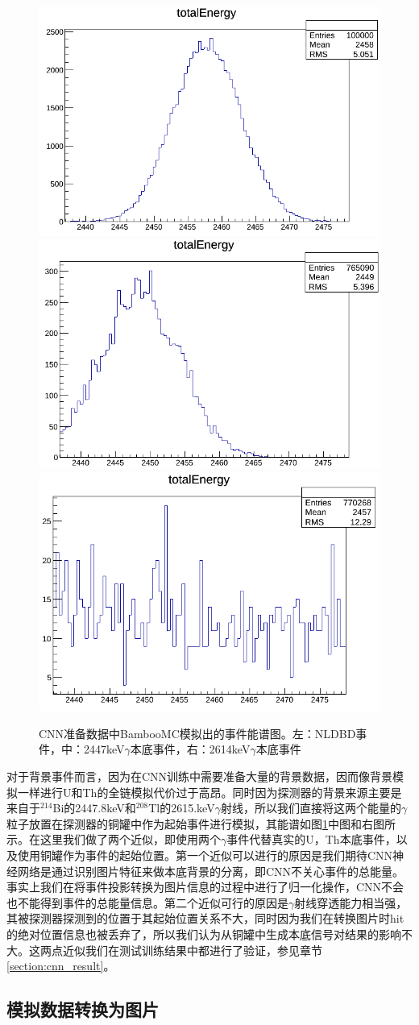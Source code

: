 \begin{figure}
    \centering
    \includegraphics[width=0.3\columnwidth]{pic/nldbd_raw_spectrum.png}
    \includegraphics[width=0.3\columnwidth]{pic/2447_raw_spectrum.png}
    \includegraphics[width=0.3\columnwidth]{pic/2614_raw_spectrum.png}
    \caption{CNN准备数据中BambooMC模拟出的事件能谱图。左：NLDBD事件，中：2447keV$\gamma$本底事件，右：2614keV$\gamma$本底事件}
    \label{fig:nldbd_energy}
\end{figure}

对于背景事件而言，因为在CNN训练中需要准备大量的背景数据，因而像背景模拟一样进行U和Th的全链模拟代价过于高昂。同时因为探测器的背景来源主要是来自于$^{214}$Bi的2447.8keV和$^{208}$Tl的2615.keV$\gamma$射线，所以我们直接将这两个能量的$\gamma$粒子放置在探测器的铜罐中作为起始事件进行模拟，其能谱如图\ref{fig:nldbd_energy}中图和右图所示。在这里我们做了两个近似，即使用两个$\gamma$事件代替真实的U，Th本底事件，以及使用铜罐作为事件的起始位置。第一个近似可以进行的原因是我们期待CNN神经网络是通过识别图片特征来做本底背景的分离，即CNN不关心事件的总能量。事实上我们在将事件投影转换为图片信息的过程中进行了归一化操作，CNN不会也不能得到事件的总能量信息。第二个近似可行的原因是$\gamma$射线穿透能力相当强，其被探测器探测到的位置于其起始位置关系不大，同时因为我们在转换图片时hit的绝对位置信息也被丢弃了，所以我们认为从铜罐中生成本底信号对结果的影响不大。这两点近似我们在测试训练结果中都进行了验证，参见章节\ref{section:cnn_result}。

\subsection{模拟数据转换为图片}

